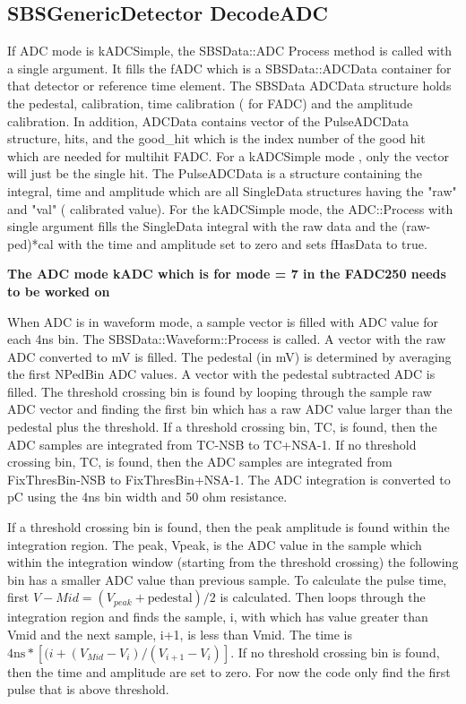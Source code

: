 \documentclass[11pt]{article}
\begin{document}
\subsection{SBSGenericDetector DecodeADC}
If ADC mode is kADCSimple, the SBSData::ADC Process method is called with a single argument.
It  fills the fADC which is a SBSData::ADCData container for that detector or reference time element. 
The SBSData ADCData structure holds the pedestal, calibration, time calibration ( for FADC) 
and the amplitude calibration. In addition, ADCData contains vector of the PulseADCData structure, hits, and
 the good\_hit which is the index number of the good
hit which are needed for multihit FADC.  For a kADCSimple mode , only the vector will just
be the single hit. The PulseADCData is a structure containing the integral, time and amplitude
which are all SingleData structures having the "raw" and "val" ( calibrated value).
For the kADCSimple mode, the ADC::Process with single argument fills the SingleData integral with the raw data 
and the (raw-ped)*cal with the time and amplitude set to zero and sets fHasData to true.

{\bf The ADC mode kADC which is for mode = 7 in the FADC250 needs to be worked on}


When ADC is in waveform mode, a sample vector is filled with ADC value for
each 4ns bin. The SBSData::Waveform::Process is called.
A vector with the raw ADC converted to mV is filled. The pedestal (in mV) is determined by averaging the first NPedBin ADC values. A vector with the pedestal subtracted ADC is filled.
The threshold crossing bin is found by looping through the sample raw ADC vector and finding the first bin which has a raw ADC value larger than the pedestal plus the threshold.
If a threshold crossing bin, TC, is found, then the ADC samples are integrated from TC-NSB to TC+NSA-1.
If no  threshold crossing bin, TC, is found, then the ADC samples are integrated from FixThresBin-NSB to FixThresBin+NSA-1.
The ADC integration is converted to pC using the 4ns bin width and 50 ohm resistance.

If a threshold crossing bin is found, then the peak amplitude is found within the integration region. The peak, Vpeak,  is the ADC value in the sample which within the integration window (starting from the threshold crossing) the following bin has a smaller ADC value than previous sample.
To calculate the pulse time, first  $V-{Mid} = (V_{peak} + \mbox{pedestal})/2$ is calculated. Then loops through the
integration region and finds the sample, i, with which has value greater than Vmid and the next sample, i+1, is
less than Vmid. The time is $4\mbox{ns}*\left[(i+(V_{Mid}-V_i)/(V_{i+1}-V_i)\right]$.
If no threshold crossing bin is found, then the time and amplitude are set to zero.
For now the code only find the first pulse that is above threshold.
\end{document}
